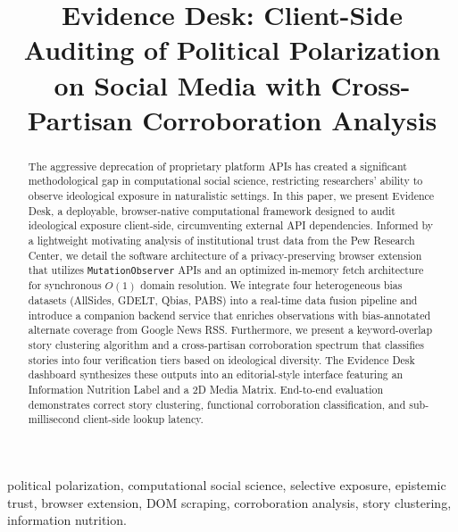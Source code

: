 \documentclass[10pt, conference, compsoc]{IEEEtran}
\begin{document}
\title{Evidence Desk: Client-Side Auditing of Political Polarization on Social Media with Cross-Partisan Corroboration Analysis}

\author{
}

\maketitle

\begin{abstract}
The aggressive deprecation of proprietary platform APIs has created a significant methodological gap in computational social science, restricting researchers' ability to observe ideological exposure in naturalistic settings. In this paper, we present Evidence Desk, a deployable, browser-native computational framework designed to audit ideological exposure client-side, circumventing external API dependencies. Informed by a lightweight motivating analysis of institutional trust data from the Pew Research Center, we detail the software architecture of a privacy-preserving browser extension that utilizes \texttt{MutationObserver} APIs and an optimized in-memory fetch architecture for synchronous $O(1)$ domain resolution. We integrate four heterogeneous bias datasets (AllSides, GDELT, Qbias, PABS) into a real-time data fusion pipeline and introduce a companion backend service that enriches observations with bias-annotated alternate coverage from Google News RSS. Furthermore, we present a keyword-overlap story clustering algorithm and a cross-partisan corroboration spectrum that classifies stories into four verification tiers based on ideological diversity. The Evidence Desk dashboard synthesizes these outputs into an editorial-style interface featuring an Information Nutrition Label and a 2D Media Matrix. End-to-end evaluation demonstrates correct story clustering, functional corroboration classification, and sub-millisecond client-side lookup latency.
\end{abstract}

\begin{IEEEkeywords}
political polarization, computational social science, selective exposure, epistemic trust, browser extension, DOM scraping, corroboration analysis, story clustering, information nutrition.
\end{IEEEkeywords}
\end{document}
